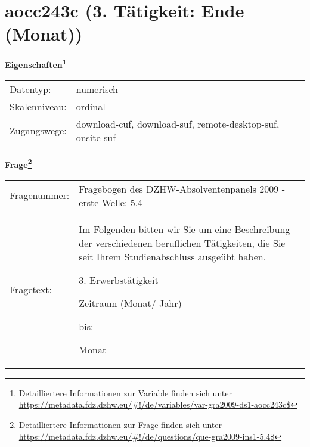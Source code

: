 
    \setcounter{footnote}{0}

    \vspace*{-1.8cm}
	\section{aocc243c (3. Tätigkeit: Ende (Monat))}
	\label{section:aocc243c}



    \vspace*{0.5cm}
    \noindent\textbf{Eigenschaften\footnote{Detailliertere Informationen zur Variable finden sich unter
		\url{https://metadata.fdz.dzhw.eu/\#!/de/variables/var-gra2009-ds1-aocc243c$}}}\\
	\begin{tabularx}{\hsize}{@{}lX}
	Datentyp: & numerisch \\
	Skalenniveau: & ordinal \\
	Zugangswege: &
	  download-cuf, 
	  download-suf, 
	  remote-desktop-suf, 
	  onsite-suf
 \\
    \end{tabularx}



				\vspace*{0.5cm}
                \noindent\textbf{Frage\footnote{Detailliertere Informationen zur Frage finden sich unter
		              \url{https://metadata.fdz.dzhw.eu/\#!/de/questions/que-gra2009-ins1-5.4$}}}\\
				\begin{tabularx}{\hsize}{@{}lX}
					Fragenummer: &
					  Fragebogen des DZHW-Absolventenpanels 2009 - erste Welle:
					  5.4
 \\
					Fragetext: & Im Folgenden bitten wir Sie um eine Beschreibung der verschiedenen beruflichen Tätigkeiten, die Sie seit Ihrem Studienabschluss ausgeübt haben.\par  3. Erwerbstätigkeit\par  Zeitraum (Monat/ Jahr)\par  bis:\par  Monat \\
				\end{tabularx}





